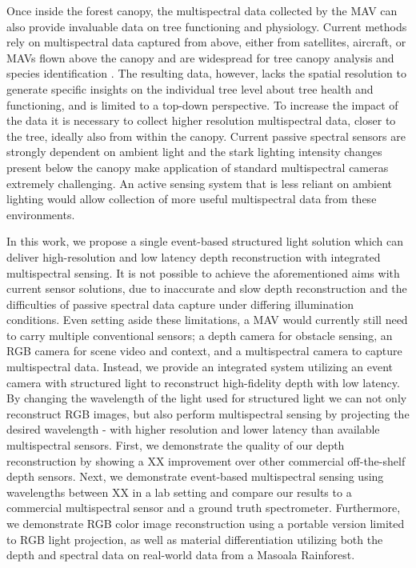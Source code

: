 Once inside the forest canopy, the multispectral data collected by the MAV can also provide invaluable data on tree functioning and physiology. Current methods rely on multispectral data captured from above, either from satellites, aircraft, or MAVs flown above the canopy \cite{Jarocinska2023} and are widespread for tree canopy analysis and species identification \cite{Xu2020a}. The resulting data, however, lacks the spatial resolution to generate specific insights on the individual tree level about tree health and functioning, and is limited to a top-down perspective. To increase the impact of the data it is necessary to collect higher resolution multispectral data, closer to the tree, ideally also from within the canopy. Current passive spectral sensors are strongly dependent on ambient light and the stark lighting intensity changes present below the canopy make application of standard multispectral cameras extremely challenging. An active sensing system that is less reliant on ambient lighting would allow collection of more useful multispectral data from these environments.

In this work, we propose a single event-based structured light solution which can deliver high-resolution and low latency depth reconstruction with integrated multispectral sensing. 
It is not possible to achieve the aforementioned aims with current sensor solutions, due to inaccurate and slow depth reconstruction and the difficulties of passive spectral data capture under differing illumination conditions. Even setting aside these limitations, a MAV would currently still need to carry multiple conventional sensors; a depth camera for obstacle sensing, an RGB camera for scene video and context, and a multispectral camera to capture multispectral data. Instead, we provide an integrated system utilizing an event camera with structured light to reconstruct high-fidelity depth with low latency. By changing the wavelength of the light used for structured light we can not only reconstruct RGB images, but also perform multispectral sensing by projecting the desired wavelength - with higher resolution and lower latency than available multispectral sensors. First, we demonstrate the quality of our depth reconstruction by showing a XX improvement over other commercial off-the-shelf depth sensors. Next, we demonstrate event-based multispectral sensing using wavelengths between XX in a lab setting and compare our results to a commercial multispectral sensor and a ground truth spectrometer. Furthermore, we demonstrate RGB color image reconstruction using a portable version limited to RGB light projection, as well as material differentiation utilizing both the depth and spectral data on real-world data from a Masoala Rainforest.

